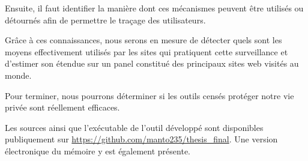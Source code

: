 Ensuite, il faut identifier la manière dont ces mécanismes peuvent être utilisés ou détournés afin de permettre le traçage des utilisateurs.

Grâce à ces connaissances, nous serons en mesure de détecter quels sont les moyens effectivement utilisés par les sites qui pratiquent cette surveillance et d'estimer son étendue sur un panel constitué des principaux sites web visités au monde.

Pour terminer, nous pourrons déterminer si les outils censés protéger notre vie privée sont réellement efficaces. %
\newline

Les sources ainsi que l'exécutable de l'outil développé sont disponibles publiquement sur \url{https://github.com/manto235/thesis_final}. Une version électronique du mémoire y est également présente.
